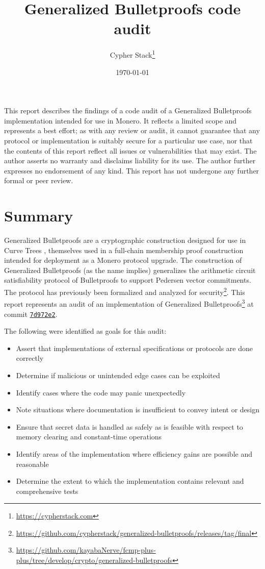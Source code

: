 \documentclass{article}
\title{Generalized Bulletproofs code audit}
\author{Cypher Stack\thanks{\url{https://cypherstack.com}}}
\date{\today}
\begin{document}
\maketitle

This report describes the findings of a code audit of a Generalized Bulletproofs implementation intended for use in Monero.
It reflects a limited scope and represents a best effort; as with any review or audit, it cannot guarantee that any protocol or implementation is suitably secure for a particular use case, nor that the contents of this report reflect all issues or vulnerabilities that may exist.
The author asserts no warranty and disclaims liability for its use.
The author further expresses no endorsement of any kind.
This report has not undergone any further formal or peer review.

\tableofcontents


\section{Summary}

Generalized Bulletproofs are a cryptographic construction designed for use in Curve Trees \cite{ct}, themselves used in a full-chain membership proof construction intended for deployment as a Monero protocol upgrade.
The construction of Generalized Bulletproofs (as the name implies) generalizes the arithmetic circuit satisfiability protocol of Bulletproofs \cite{bp} to support Pedersen vector commitments.
The protocol has previously been formalized and analyzed for security\footnote{\url{https://github.com/cypherstack/generalized-bulletproofs/releases/tag/final}}.
This report represents an audit of an implementation of Generalized Bulletproofs\footnote{\url{https://github.com/kayabaNerve/fcmp-plus-plus/tree/develop/crypto/generalized-bulletproofs}} at commit \href{https://github.com/kayabaNerve/fcmp-plus-plus/commit/7d972e2b16fe57f4dfa4a9549d2fbb9306411704}{\texttt{7d972e2}}.

The following were identified as goals for this audit:
\begin{itemize}
\item Assert that implementations of external specifications or protocols are done correctly
\item Determine if malicious or unintended edge cases can be exploited
\item Identify cases where the code may panic unexpectedly
\item Note situations where documentation is insufficient to convey intent or design
\item Ensure that secret data is handled as safely as is feasible with respect to memory clearing and constant-time operations
\item Identify areas of the implementation where efficiency gains are possible and reasonable
\item Determine the extent to which the implementation contains relevant and comprehensive tests
\end{itemize}
\end{document}

